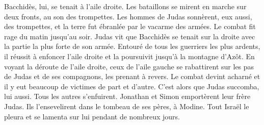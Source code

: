 Bacchidès, lui, se tenait à l’aile droite.
Les bataillons se mirent en marche sur deux fronts, au son des trompettes.
Les hommes de Judas sonnèrent, eux aussi, des trompettes,
	et la terre fut ébranlée par le vacarme des armées.
	Le combat fit rage du matin jusqu’au soir.
Judas vit que Bacchidès se tenait sur la droite avec la partie la plus forte de son armée.
Entouré de tous les guerriers les plus ardents,
	il réussit à enfoncer l’aile droite et la poursuivit jusqu’à la montagne d’Azôt.
En voyant la déroute de l’aile droite,
	ceux de l’aile gauche se rabattirent sur les pas de Judas et de ses compagnons,
	les prenant à revers.
Le combat devint acharné et il y eut beaucoup de victimes de part et d’autre.
C’est alors que Judas succomba, lui aussi.
	Tous les autres s’enfuirent.
Jonathan et Simon emportèrent leur frère Judas.
	Ils l’ensevelirent dans le tombeau de ses pères, à Modine.
Tout Israël le pleura et se lamenta sur lui pendant de nombreux jours.
